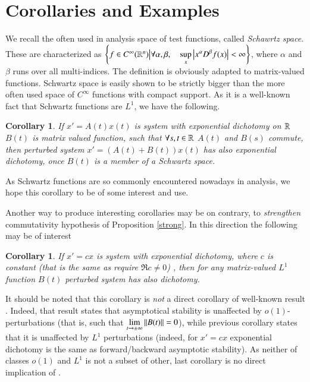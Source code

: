 \documentclass{elsarticle}
\newtheorem{corollary}[proposition]{Corollary}
\theoremstyle{remark}
\begin{document}
\section{Corollaries and Examples}
We recall the often used in analysis space of test functions, called \textit{Schawrtz space}. These are characterized
as $\mysetn{f\in C^{\infty}(\mathbb{R}^n)}{\forall \alpha,\beta,\quad\sup_x\myabs{x^\alpha D^\beta f(x)}<\infty}$,
where $\alpha$ and $\beta$ runs over all multi-indices. The definition is obviously adapted to matrix-valued functions.
Schwartz space is easily shown to be strictly bigger than the more often used space of $C^\infty$ functions with compact support.
As it is a well-known fact that Schwartz functions are $L^1$, we have the following.
\begin{corollary}
	If $x'=A(t)x(t)$ is system with exponential dichotomy on $\mathbb{R}$ $B(t)$ is matrix valued function, such that $\forall s,t\in\mathbb{R}$
	$A(t)$ and $B(s)$ commute, then perturbed system $x'=(A(t)+B(t))x(t)$ has also exponential dichotomy, once $B(t)$ is a member
	of a Schwartz space.
\end{corollary}
As Schwartz functions are so commonly encountered nowadays in analysis, we hope this corollary to be of some interest and use.

Another way to produce interesting corollaries may be on contrary, to \textit{strengthen} commutativity hypothesis of Proposition
\ref{strong}. In this direction the following may be of interest
\begin{corollary}
	If $x'=cx$ is system with exponential dichotomy, where $c$ is constant (that is the same as require $\Re c\neq0$)
	, then for \textit{any} matrix-valued $L^1$ function $B(t)$ perturbed system has also dichotomy.
\end{corollary}
It should be noted that this corollary is \textit{not} a direct corollary of well-known result 
\cite[Corollary 3.21]{teschlordinary}. Indeed, that result states that asymptotical stability is unaffected by 
$o(1)$-perturbations (that is, such that $\lim_{t\to\pm\infty}\mynorm{B(t)}=0$), while previous corollary states that
it is unaffected by $L^1$ perturbations (indeed, for $x'=cx$ exponential dichotomy is the same as forward/backward asymptotic
stability). As neither of classes $o(1)$ and $L^1$ is not a subset of other, last corollary is no direct implication of
\cite[Corollary 3.21]{teschlordinary}.
\end{document}
